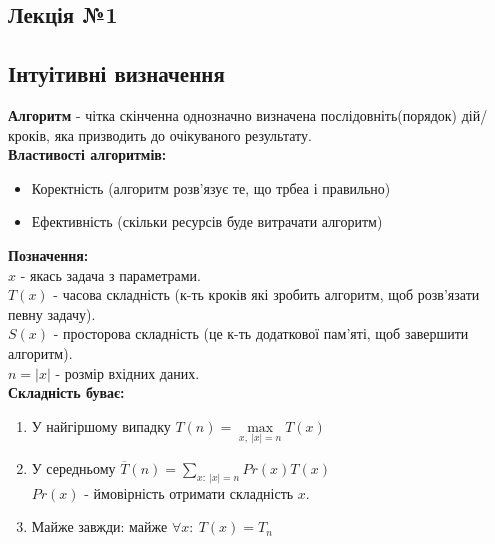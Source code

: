 \documentclass[a4paper,12pt]{article}
\newcommand{\dsum}{\displaystyle\sum}
\begin{document}
\newpage
	\renewcommand*\contentsname{Contents}
	\tableofcontents

\newpage
    \begin{center}
        \hrulefill
        \section{Лекція №1}
        \hrulefill
    \end{center}
    \subsection{Інтуітивні визначення}
    \textbf{Алгоритм} - чітка скінченна однозначно визначена послідовніть(порядок) дій/кроків,
    яка призводить до очікуваного результату. \\
    \textbf{Властивості алгоритмів:}
    \begin{itemize}
        \item Коректність (алгоритм розв'язує те, що трбеа і правильно)
        \item Ефективність (скільки ресурсів буде витрачати алгоритм)
    \end{itemize}
    \textbf{Позначення:} \\
    $x$ - якась задача з параметрами. \\
    $T(x)$ - часова складність (к-ть кроків які зробить алгоритм, щоб розв'язати певну задачу). \\
    $S(x)$ - просторова складність (це к-ть додаткової пам'яті, щоб завершити алгоритм). \\
    $n=|x|$ - розмір вхідних даних. \\
    \textbf{Складність буває:}
    \begin{enumerate}
        \item У найгіршому випадку $T(n)=\underset{x,\:|x|=n}{\max} T(x)$
        \item У середньому $\overline{T}(n)=\dsum\limits_{x:\:|x|=n}^{}Pr(x)T(x)$ \\
        $Pr(x)$ - ймовірність отримати складність $x$.
        \item Майже завжди: майже $\forall x:\: T(x)=T_n$
    \end{enumerate} 
    
\end{document}
